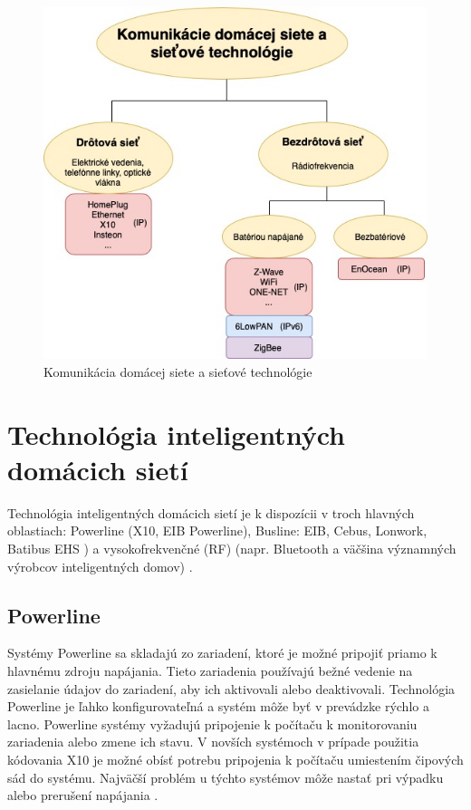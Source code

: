 \documentclass[twoside]{ctuthesis}
\theoremstyle{plain}
\theoremstyle{definition}
\theoremstyle{note}
\begin{document}
\begin{figure}[H]
\includegraphics[width=\linewidth]{diagram-2.jpg}
\caption{Komunikácia domácej siete a sieťové technológie \cite{comunication}}
\label{fig:net}
\end{figure}

\section{Technológia inteligentných domácich sietí} 
Technológia inteligentných domácich sietí je k dispozícii v troch hlavných oblastiach: Powerline (X10, EIB Powerline), Busline: EIB, Cebus, Lonwork, Batibus EHS ) a vysokofrekvenčné (RF) (napr. Bluetooth a väčšina významných výrobcov inteligentných domov)  \cite{networks}.

\subsection{Powerline}
Systémy Powerline sa skladajú zo zariadení, ktoré je možné pripojiť priamo k hlavnému zdroju napájania. Tieto zariadenia používajú bežné vedenie na zasielanie údajov do zariadení, aby ich aktivovali alebo deaktivovali. Technológia Powerline je ľahko konfigurovateľná a systém môže byť v prevádzke rýchlo a lacno. Powerline systémy vyžadujú pripojenie k počítaču k monitorovaniu zariadenia alebo zmene ich stavu. V novších systémoch v prípade použitia kódovania X10 je možné obísť potrebu pripojenia k počítaču umiestením čipových sád do systému. Najväčší problém u týchto systémov môže nastať pri výpadku alebo prerušení napájania  \cite{networks}.
\end{document}
